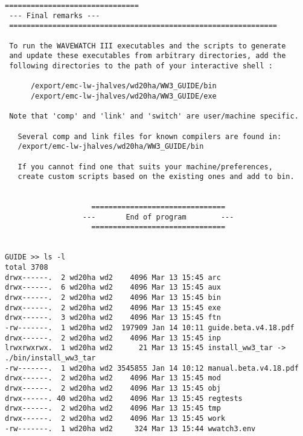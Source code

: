\begin{minipage}[c]{4.5in}
{\scriptsize \begin{verbatim}
=============================== 
 --- Final remarks ---
 ============================================================== 

 To run the WAVEWATCH III executables and the scripts to generate 
 and update these executables from arbitrary directories, add the
 following directories to the path of your interactive shell : 

      /export/emc-lw-jhalves/wd20ha/WW3_GUIDE/bin
      /export/emc-lw-jhalves/wd20ha/WW3_GUIDE/exe

 Note that 'comp' and 'link' and 'switch' are user/machine specific.

   Several comp and link files for known compilers are found in:
   /export/emc-lw-jhalves/wd20ha/WW3_GUIDE/bin

   If you cannot find one that suits your machine/preferences, 
   create custom scripts based on the existing ones and add to bin.


                    ===============================
                  ---       End of program        --- 
                    =============================== 
 

GUIDE >> ls -l
total 3708
drwx------.  2 wd20ha wd2    4096 Mar 13 15:45 arc
drwx------.  6 wd20ha wd2    4096 Mar 13 15:45 aux
drwx------.  2 wd20ha wd2    4096 Mar 13 15:45 bin
drwx------.  2 wd20ha wd2    4096 Mar 13 15:45 exe
drwx------.  3 wd20ha wd2    4096 Mar 13 15:45 ftn
-rw-------.  1 wd20ha wd2  197909 Jan 14 10:11 guide.beta.v4.18.pdf
drwx------.  2 wd20ha wd2    4096 Mar 13 15:45 inp
lrwxrwxrwx.  1 wd20ha wd2      21 Mar 13 15:45 install_ww3_tar -> ./bin/install_ww3_tar
-rw-------.  1 wd20ha wd2 3545855 Jan 14 10:12 manual.beta.v4.18.pdf
drwx------.  2 wd20ha wd2    4096 Mar 13 15:45 mod
drwx------.  2 wd20ha wd2    4096 Mar 13 15:45 obj
drwx------. 40 wd20ha wd2    4096 Mar 13 15:45 regtests
drwx------.  2 wd20ha wd2    4096 Mar 13 15:45 tmp
drwx------.  2 wd20ha wd2    4096 Mar 13 15:45 work
-rw-------.  1 wd20ha wd2     324 Mar 13 15:44 wwatch3.env

\end{verbatim}}
\end{minipage}

